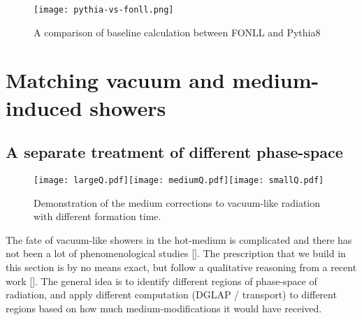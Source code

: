 \begin{figure}
\centering
\texttt{[image: pythia-vs-fonll.png]}
\caption{A comparison of baseline calculation between FONLL and Pythia8}
\label{fig:pythia-fonll}
\end{figure}

\section{Matching vacuum and medium-induced showers}

\subsection{A separate treatment of different phase-space}
\label{section:match}
\begin{figure}
\texttt{[image: largeQ.pdf]}\texttt{[image: mediumQ.pdf]}\texttt{[image: smallQ.pdf]}
\caption{Demonstration of the medium corrections to vacuum-like radiation with different formation time.}
\label{fig:vac-med-interface}
\end{figure}
The fate of vacuum-like showers in the hot-medium is complicated and there has not been a lot of phenomenological studies [].
The prescription that we build in this section is by no means exact, but follow a qualitative reasoning from a recent work [].
The general idea is to identify different regions of phase-space of radiation, and apply different computation (DGLAP / transport) to different regions based on how much medium-modifications it would have received.

